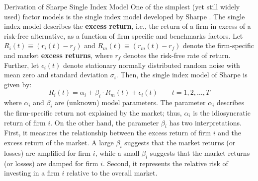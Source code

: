 \documentclass[11pt]{article}
\makeatletter
\theoremstyle{definition}
\renewcommand\subsubsection{\@startsection
	{subsubsection}{2}{0mm}
	{-0.05in}
	{-0.5\baselineskip}
	{\normalfont\normalsize\itshape\bfseries}}
\makeatother
\begin{document}
\subsubsection{Derivation of Sharpe Single Index Model}\label{subsec:derivation-single-factor-model}
One of the simplest (yet still widely used) factor models is the single index model developed by Sharpe \cite{SHARPE1963}.
The single index model describes the \textbf{excess return}, i.e., the return of a firm in excess of a risk-free
alternative, as a function of firm specific and benchmarks factors. Let $R_{i}(t)\equiv\left(r_{i}\left(t\right) - r_{f}\right)$ 
and $R_{m}(t)\equiv\left(r_{m}\left(t\right)-r_{f}\right)$ denote the firm-specific and market \textbf{excess returns}, 
where $r_{f}$ denotes the risk-free rate of return. Further, let $\epsilon_{i}\left(t\right)$ denote stationary normally distributed random noise
with mean zero and standard deviation $\sigma_{i}$. Then, the single index model of Sharpe is given by:
\begin{equation*}
R_{i}\left(t\right) = \alpha_{i}+\beta_{i}\cdot{R}_{m}\left(t\right)+\epsilon_{i}
\left(t\right)\qquad{t=1,2,\dots,T}
\end{equation*}
where $\alpha_{i}$ and $\beta_{i}$ are (unknown) model parameters. 
The parameter $\alpha_{i}$ describes the firm-specific return not explained by the market; thus, $\alpha_{i}$ is the idiosyncratic return of firm $i$.
On the other hand, the parameter $\beta_{i}$ has two interpretations. First, it measures the relationship between the excess return of firm $i$ and the excess return of the market. 
A large $\beta_{i}$ suggests that the market returns (or losses) are amplified for firm $i$, while a small $\beta_{i}$ suggests that the market returns (or losses) are damped for firm $i$. 
Second, it represents the relative risk of investing in a firm $i$ relative to the overall market.

\end{document}
